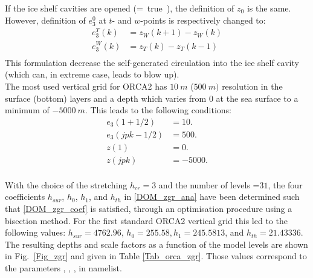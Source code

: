 \documentclass[NEMO_book]{subfiles}
\begin{document}
{If the ice shelf cavities are opened (=~true~}), the definition of $z_0$ is the same. 
However, definition of $e_3^0$ at $t$- and $w$-points is respectively changed to:
\begin{equation} \label{DOM_zgr_ana}
\begin{split}
 e_3^T(k) &= z_W (k+1) - z_W (k)   \\
 e_3^W(k) &= z_T (k)   - z_T (k-1) \\
\end{split}
\end{equation}
This formulation decrease the self-generated circulation into the ice shelf cavity 
(which can, in extreme case, leads to blow up).\\

 
The most used vertical grid for ORCA2 has $10~m$ ($500~m)$ resolution in the 
surface (bottom) layers and a depth which varies from 0 at the sea surface to a 
minimum of $-5000~m$. This leads to the following conditions:
\begin{equation} \label{DOM_zgr_coef}
\begin{split}
 e_3 (1+1/2)		&=10. \\ 
 e_3 (jpk-1/2)	&=500. \\ 
 z(1)			&=0. \\ 
 z(jpk)			&=-5000. \\ 
\end{split}
\end{equation}

With the choice of the stretching $h_{cr} =3$ and the number of levels 
=$31$, the four coefficients $h_{sur}$, $h_{0}$, $h_{1}$, and $h_{th}$ in 
\eqref{DOM_zgr_ana} have been determined such that \eqref{DOM_zgr_coef} is 
satisfied, through an optimisation procedure using a bisection method. For the first 
standard ORCA2 vertical grid this led to the following values: $h_{sur} =4762.96$, 
$h_0 =255.58, h_1 =245.5813$, and $h_{th} =21.43336$. The resulting depths and 
scale factors as a function of the model levels are shown in Fig.~\ref{Fig_zgr} and 
given in Table \ref{Tab_orca_zgr}. Those values correspond to the parameters 
, , ,  in  namelist. 
\end{document}
